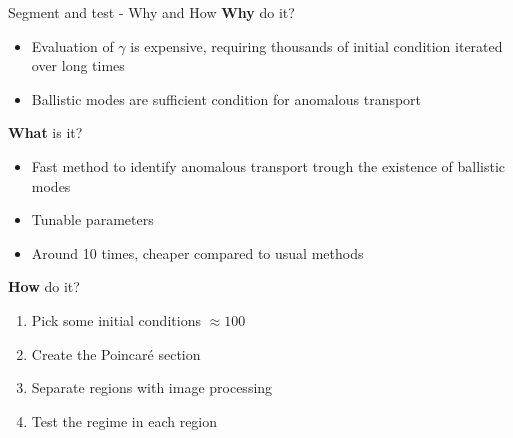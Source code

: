 \documentclass[10pt]{beamer}
\begin{document}
\begin{frame}{Segment and test - Why and How}
    \textbf{Why} do it?
    \begin{itemize}
        \item Evaluation of $\gamma$ is expensive, requiring thousands of initial condition iterated over long times
        \item Ballistic modes are sufficient condition for anomalous transport
    \end{itemize}

    \textbf{What} is it?
    \begin{itemize}
        \item Fast method to identify anomalous transport trough the existence of ballistic modes
        \item Tunable parameters 
        \item Around 10 times, cheaper compared to usual methods
    \end{itemize}

    \textbf{How} do it?
    \begin{enumerate}
        \item Pick some initial conditions $\approx 100$
        \item Create the Poincaré section
        \item Separate regions with image processing
        \item Test the regime in each region
    \end{enumerate}



\end{frame}
\end{document}
